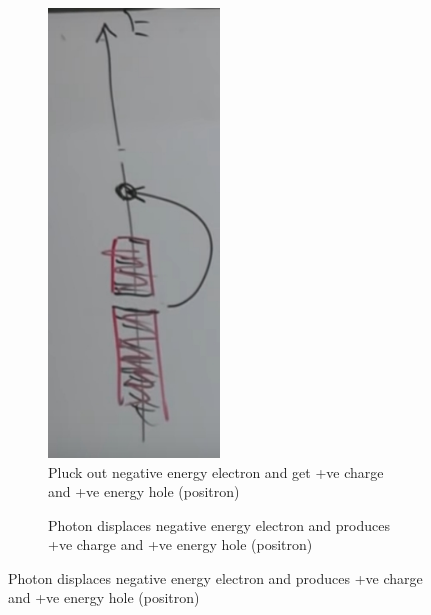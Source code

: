 \documentclass[]{article}
\begin{document}
\begin{figure}[H]
\begin{center}
\begin{subfigure}[t]{0.3\textwidth}
			\begin{center}
				\caption{Pluck out negative energy electron and get +ve charge and +ve energy hole (positron)}\label{fig:dirac:sea}
				\includegraphics[width=0.5\textwidth]{DiracSea}
			\end{center}
		\end{subfigure}
		\begin{subfigure}[t]{0.3\textwidth}
			\begin{center}
				\caption{Photon displaces negative energy electron and produces +ve charge and +ve energy hole (positron)}\label{fig:dirac:sea:photon}

\end{center}
\end{subfigure}
\end{center}
\end{figure}
\end{document}
